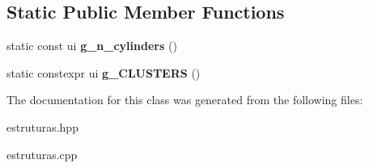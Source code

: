 \subsection*{Static Public Member Functions}
\begin{DoxyCompactItemize}
\item 
static const ui {\bfseries g\+\_\+n\+\_\+cylinders} ()\hypertarget{classHardDrive_a62d430a815c360dbcc2b80c8da2d7ffe}{}\label{classHardDrive_a62d430a815c360dbcc2b80c8da2d7ffe}

\item 
static constexpr ui {\bfseries g\+\_\+\+C\+L\+U\+S\+T\+E\+RS} ()\hypertarget{classHardDrive_aac2e81c55187c2fae1784c1cefe8bb85}{}\label{classHardDrive_aac2e81c55187c2fae1784c1cefe8bb85}

\end{DoxyCompactItemize}


The documentation for this class was generated from the following files\+:\begin{DoxyCompactItemize}
\item 
estruturas.\+hpp\item 
estruturas.\+cpp\end{DoxyCompactItemize}
